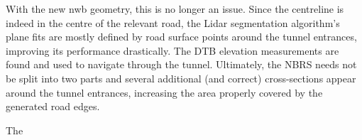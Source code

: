 With the new \ac{nwb} geometry, this is no longer an issue. Since the centreline is indeed in the centre of the relevant road, the Lidar segmentation algorithm's plane fits are mostly defined by road surface points around the tunnel entrances, improving its performance drastically. The DTB elevation measurements are found and used to navigate through the tunnel. Ultimately, the NBRS needs not be split into two parts and several additional (and correct) cross-sections appear around the tunnel entrances, increasing the area properly covered by the generated road edges.

The 
